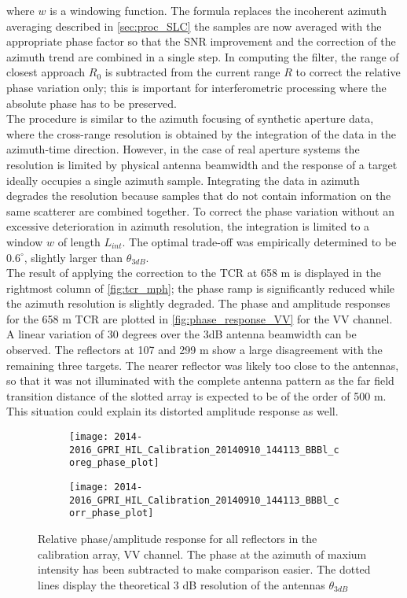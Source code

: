 where $w$ is a windowing function. The formula replaces the incoherent azimuth averaging described in \autoref{sec:proc_SLC} the samples are now averaged with the appropriate phase factor so that the SNR improvement and the correction of the azimuth trend are combined in a single step. In computing the filter, the range of closest approach $R_{0}$ is subtracted from the current range $R$ to correct the relative phase variation only; this is important for interferometric processing where the absolute phase has to be preserved.\\
The procedure is similar to the azimuth focusing of synthetic aperture data, where the cross-range resolution is obtained by the integration of the data in the azimuth-time direction. However, in the case of real aperture systems the resolution is limited by  physical antenna beamwidth and the response of a target ideally occupies a single azimuth sample. Integrating the data in azimuth degrades the resolution because samples that do not contain information on the same scatterer are combined together. To correct the phase variation without an excessive deterioration in azimuth resolution, the integration is limited to a window  $w$ of length $L_{int}$. The optimal trade-off was empirically determined to be $0.6^\circ$, slightly larger than $\theta_{3dB}$.\\
The result of applying the correction to the TCR at 658 m is displayed in the rightmost column of \autoref{fig:tcr_mph}; the phase ramp is significantly reduced while the azimuth resolution is slightly degraded.
The phase and amplitude responses for the 658 m TCR are plotted in \autoref{fig:phase_response_VV} for the VV channel. A linear variation of 30 degrees over the 3dB antenna beamwidth can be observed. The reflectors at 107 and 299 m show a large disagreement with the remaining three targets. The nearer reflector was likely too close to the antennas, so that it was not illuminated with the complete antenna pattern as the far field transition distance of the slotted array is expected to be of the order of 500 m. This situation could explain its distorted amplitude response as well. 
\begin{figure}[ht]
	\begin{subfigure}[t]{\columnwidth}
		\texttt{[image: 2014-2016\_GPRI\_HIL\_Calibration\_20140910\_144113\_BBBl\_coreg\_phase\_plot]}
	\end{subfigure}
	\begin{subfigure}[t]{\columnwidth}
		\texttt{[image: 2014-2016\_GPRI\_HIL\_Calibration\_20140910\_144113\_BBBl\_corr\_phase\_plot]}
	\end{subfigure}
	\caption{Relative phase/amplitude response for all reflectors in the calibration array, VV channel. The phase at the azimuth of maxium intensity has been subtracted to make comparison easier. The dotted lines display the theoretical 3 dB resolution of the antennas $\theta_{3dB}$}
	\label{fig:phase_response_VV}
\end{figure}
